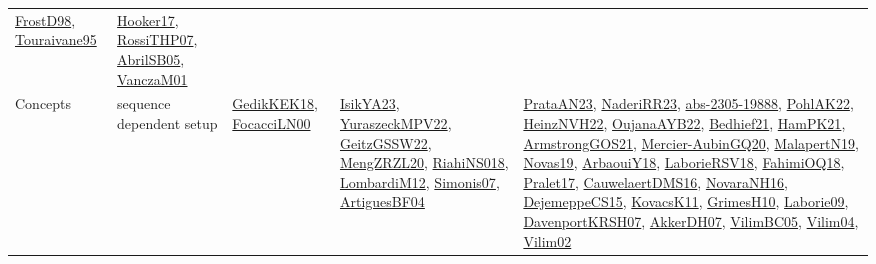 {\begin{longtable}{lp{3cm}>{\raggedright}p{6cm}>{\raggedright}p{6cm}p{8cm}}
\href{papers/FrostD98.pdf}{FrostD98}\cite{FrostD98}, \href{papers/Touraivane95.pdf}{Touraivane95}\cite{Touraivane95} & \href{papers/Hooker17.pdf}{Hooker17}\cite{Hooker17}, \href{papers/RossiTHP07.pdf}{RossiTHP07}\cite{RossiTHP07}, \href{papers/AbrilSB05.pdf}{AbrilSB05}\cite{AbrilSB05}, \href{papers/VanczaM01.pdf}{VanczaM01}\cite{VanczaM01}\\
Concepts & sequence dependent setup & \href{articles/GedikKEK18.pdf}{GedikKEK18}\cite{GedikKEK18}, \href{papers/FocacciLN00.pdf}{FocacciLN00}\cite{FocacciLN00} & \href{articles/IsikYA23.pdf}{IsikYA23}\cite{IsikYA23}, \href{articles/YuraszeckMPV22.pdf}{YuraszeckMPV22}\cite{YuraszeckMPV22}, \href{papers/GeitzGSSW22.pdf}{GeitzGSSW22}\cite{GeitzGSSW22}, \href{articles/MengZRZL20.pdf}{MengZRZL20}\cite{MengZRZL20}, \href{papers/RiahiNS018.pdf}{RiahiNS018}\cite{RiahiNS018}, \href{articles/LombardiM12.pdf}{LombardiM12}\cite{LombardiM12}, \href{articles/Simonis07.pdf}{Simonis07}\cite{Simonis07}, \href{papers/ArtiguesBF04.pdf}{ArtiguesBF04}\cite{ArtiguesBF04} & \href{articles/PrataAN23.pdf}{PrataAN23}\cite{PrataAN23}, \href{articles/NaderiRR23.pdf}{NaderiRR23}\cite{NaderiRR23}, \href{articles/abs-2305-19888.pdf}{abs-2305-19888}\cite{abs-2305-19888}, \href{articles/PohlAK22.pdf}{PohlAK22}\cite{PohlAK22}, \href{articles/HeinzNVH22.pdf}{HeinzNVH22}\cite{HeinzNVH22}, \href{papers/OujanaAYB22.pdf}{OujanaAYB22}\cite{OujanaAYB22}, \href{articles/Bedhief21.pdf}{Bedhief21}\cite{Bedhief21}, \href{articles/HamPK21.pdf}{HamPK21}\cite{HamPK21}, \href{papers/ArmstrongGOS21.pdf}{ArmstrongGOS21}\cite{ArmstrongGOS21}, \href{papers/Mercier-AubinGQ20.pdf}{Mercier-AubinGQ20}\cite{Mercier-AubinGQ20}, \href{papers/MalapertN19.pdf}{MalapertN19}\cite{MalapertN19}, \href{articles/Novas19.pdf}{Novas19}\cite{Novas19}, \href{papers/ArbaouiY18.pdf}{ArbaouiY18}\cite{ArbaouiY18}, \href{articles/LaborieRSV18.pdf}{LaborieRSV18}\cite{LaborieRSV18}, \href{articles/FahimiOQ18.pdf}{FahimiOQ18}\cite{FahimiOQ18}, \href{papers/Pralet17.pdf}{Pralet17}\cite{Pralet17}, \href{papers/CauwelaertDMS16.pdf}{CauwelaertDMS16}\cite{CauwelaertDMS16}, \href{articles/NovaraNH16.pdf}{NovaraNH16}\cite{NovaraNH16}, \href{papers/DejemeppeCS15.pdf}{DejemeppeCS15}\cite{DejemeppeCS15}, \href{articles/KovacsK11.pdf}{KovacsK11}\cite{KovacsK11}, \href{papers/GrimesH10.pdf}{GrimesH10}\cite{GrimesH10}, \href{papers/Laborie09.pdf}{Laborie09}\cite{Laborie09}, \href{papers/DavenportKRSH07.pdf}{DavenportKRSH07}\cite{DavenportKRSH07}, \href{papers/AkkerDH07.pdf}{AkkerDH07}\cite{AkkerDH07}, \href{articles/VilimBC05.pdf}{VilimBC05}\cite{VilimBC05}, \href{papers/Vilim04.pdf}{Vilim04}\cite{Vilim04}, \href{papers/Vilim02.pdf}{Vilim02}\cite{Vilim02}\\

\end{longtable}}
